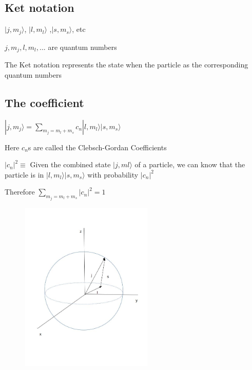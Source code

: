 \documentclass[
paper=128mm:96mm, %
fontsize=11pt, %
pagesize, %
parskip=half-, %
]{scrartcl} %
\theoremstyle{mythmstyle} %
\begin{document}
\subsection{Ket notation}

$|j,m_j\rangle$, $|l,m_l\rangle$ ,$|s,m_s\rangle$, etc

$j,m_j,l,m_l,...$ are quantum numbers

The Ket notation represents the state when the particle as the corresponding quantum numbers

\clearpage


\subsection{The coefficient}

$|j, m_j \rangle = \sum\limits_{m_j = m_l+m_s} c_n |l,m_l\rangle |s,m_s \rangle$

Here $c_n$s  are called the Clebsch-Gordan Coefficients

$|c_n|^2 \equiv$ Given the combined state $|j,ml\rangle$ of a particle, we can know that the particle is in $|l,m_l\rangle|s,m_s\rangle$ with probability $|c_n|^2$

Therefore $\sum\limits_{m_j= m_l+m_s} |c_n|^2 =1$

\clearpage

\begin{figure}

\centering
\includegraphics[height=3.2in]{coordinate}

\end{figure}

\clearpage
\end{document}
